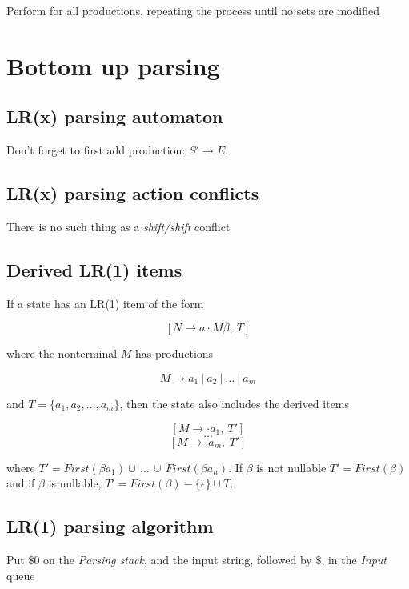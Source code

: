 \documentclass[fontsize=10pt,a4paper]{article}
\begin{document}
\begin{multicols}{3}
    Perform for all productions, repeating the process until no sets are modified

    \section{Bottom up parsing}

    \subsection{LR(x) parsing automaton}

    Don't forget to first add production: $S' \rightarrow E$.

    \subsection{LR(x) parsing action conflicts}

    There is no such thing as a \textit{shift/shift} conflict


    \subsection{Derived LR(1) items}

    If a state has an LR(1) item of the form

    \[[N \rightarrow a \cdot M \beta, ~T]\]

    where the nonterminal $M$ has productions

    \[M \rightarrow a_1 ~\vert~ a_2 ~\vert~ \dots ~\vert~ a_m\]

    and $T = \{ a_1, a_2, \dots, a_m \}$, then the state also includes the derived items

    \[[M \rightarrow \cdot a_1, ~T']\]
    \[\dots\]
    \[[M \rightarrow \cdot a_m, ~T']\]

    where $T' = First(\beta a_1) \cup\, \dots\, \cup\, First(\beta a_n)$. If $\beta$ is not nullable $T' = First(\beta)$ and if $\beta$ is nullable, $T' = First(\beta) - \{\epsilon\} \cup T$. 



    \subsection{LR(1) parsing algorithm}

    Put $\$0$ on the \textit{Parsing stack}, and the input string, followed by $\$$, in the \textit{Input} queue


\end{multicols}
\end{document}

